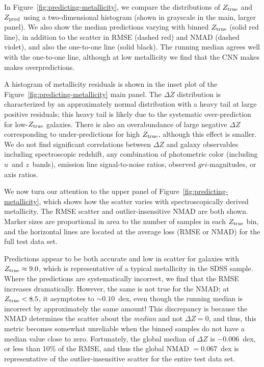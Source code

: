 \documentclass[fleqn,usenatbib]{mnras}
\newcommand{\sdssu}{\hbox{$u$}}
\newcommand{\sdssg}{\hbox{$g$}}
\newcommand{\sdssr}{\hbox{$r$}}
\newcommand{\sdssi}{\hbox{$i$}}
\newcommand{\sdssz}{\hbox{$z$}}
\begin{document}
In Figure~\ref{fig:predicting-metallicity}, we compare the distributions of $Z_{\rm true}$ and $Z_{\rm pred}$ using a two-dimensional histogram (shown in grayscale in the main, larger panel). We also show the median predictions varying with binned $Z_{\rm true}$ (solid red line), in addition to the scatter in RMSE (dashed red) and NMAD (dashed violet), and also the one-to-one line (solid black). The running median agrees well with the one-to-one line, although at low metallicity we find that the CNN makes makes overpredictions.

A histogram of metallicity residuals is shown in the inset plot of the Figure~\ref{fig:predicting-metallicity} main panel. The $\Delta Z$ distribution is characterized by an approximately normal distribution with a heavy tail at large positive residuals; this heavy tail is likely due to the systematic over-prediction for low-$Z_{\rm true}$ galaxies.
There is also an overabundance of large negative $\Delta Z$ corresponding to under-predictions for high $Z_{\rm true}$, although this effect is smaller. We do not find significant correlations between $\Delta Z$ and galaxy observables including spectroscopic redshift, any combination of photometric color (including \sdssu\ and \sdssz\ bands), emission line signal-to-noise ratios, observed \sdssg\sdssr\sdssi-magnitudes, or axis ratios.

We now turn our attention to the upper panel of Figure~\ref{fig:predicting-metallicity}, which shows how the scatter varies with spectroscopically derived metallicity. The RMSE scatter and outlier-insensitive NMAD are both shown. Marker sizes are proportional in area to the number of samples in each $Z_{\rm true}$ bin, and the horizontal lines are located at the average loss (RMSE or NMAD) for the full test data set.

Predictions appear to be both accurate and low in scatter for galaxies with $Z_{\rm true} \approx 9.0$, which is representative of a typical metallicity in the SDSS sample. Where the predictions are systematically incorrect, we find that the RMSE increases dramatically. However, the same is not true for the NMAD; at $Z_{\rm true} < 8.5$, it asymptotes to $\sim 0.10$~dex, even though the running median is incorrect by approximately the same amount! This discrepancy is because the NMAD determines the scatter about the \textit{median} and not $\Delta Z = 0$, and thus, this metric becomes somewhat unreliable when the binned samples do not have a median value close to zero. Fortunately, the global median of $\Delta Z$ is $-0.006$~dex, or less than 10\% of the RMSE, and thus the global NMAD $= 0.067$~dex is representative of the outlier-insensitive scatter for the entire test data set.
\end{document}
